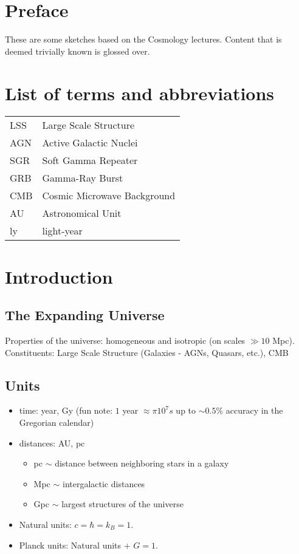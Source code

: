 

\def\ntitle{Cosmology}
\def\nauthor{mostanes}
\def\npart{II}
\def\nterm{Michelmas}
\def\nyear{2018}
\def\nlecturer{}


\mktitlepage

\newpage

\setcounter{section}{-1}

\section{Preface}
These are some sketches based on the Cosmology lectures. Content that is deemed trivially known is glossed over.

\newpage

\section{List of terms and abbreviations}
\begin{tabular}{ll}
	LSS & Large Scale Structure \\
	AGN & Active Galactic Nuclei \\
	SGR & Soft Gamma Repeater \\
	GRB & Gamma-Ray Burst \\
	CMB & Cosmic Microwave Background \\
	AU  & Astronomical Unit \\
	ly  & light-year \\
\end{tabular}

\section{Introduction}
\subsection{The Expanding Universe}
Properties of the universe: homogeneous and isotropic (on scales $\gg 10$ Mpc).\\
Constituents: Large Scale Structure (Galaxies - AGNs, Quasars, etc.), CMB

\subsection{Units}
\begin{itemize}
	\item time: year, Gy \quad (fun note: $1$ year $\approx \pi 10^7 s$ up to $\sim 0.5\%$ accuracy in the Gregorian calendar)
	\item distances: AU, pc
	\begin{itemize}
		\item pc $\sim$ distance between neighboring stars in a galaxy
		\item Mpc $\sim$ intergalactic distances
		\item Gpc $\sim$ largest structures of the universe
	\end{itemize}
	\item Natural units: $ c = \hbar = k_B = 1 $.
	\item Planck units: Natural units + $ G = 1 $.
\end{itemize}

